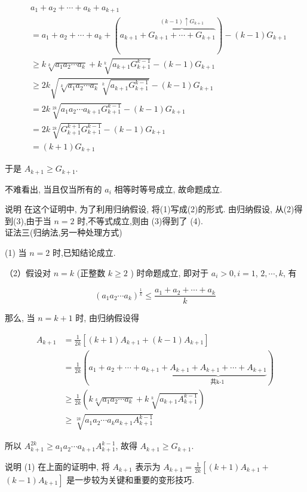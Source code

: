 \begin{align*}
& a_{1}+a_{2}+\cdots+a_{k}+a_{k+1}  \tag{1}\\
& =a_{1}+a_{2}+\cdots+a_{k}+(a_{k+1}+\overbrace{G_{k+1}+\cdots+G_{k+1}}^{(k-1) \uparrow G_{k+1}})-(k-1) G_{k+1}  \tag{2}\\
& \geqslant k \sqrt[k]{a_{1} a_{2} \cdots a_{k}}+k \sqrt[k]{a_{k+1} G_{k+1}^{k-1}}-(k-1) G_{k+1}  \tag{3}\\
& \geqslant 2 k \sqrt{\sqrt[k]{a_{1} a_{2} \cdots a_{k}} \sqrt[k]{a_{k+1} G_{k+1}^{k-1}}}-(k-1) G_{k+1}  \tag{4}\\
& =2 k \sqrt[2 k]{a_{1} a_{2} \cdots a_{k+1} G_{k+1}^{k-1}}-(k-1) G_{k+1}  \tag{5}\\
& =2 k \sqrt[2 k]{G_{k+1}^{k+1} G_{k+1}^{k-1}}-(k-1) G_{k+1}  \tag{6}\\
& =(k+1) G_{k+1} \tag{7}
\end{align*}


于是 $A_{k+1} \geqslant G_{k+1}$.

不难看出, 当且仅当所有的 $a_{i}$ 相等时等号成立, 故命题成立.

说明 在这个证明中, 为了利用归纳假设, 将(1)写成(2)的形式. 由归纳假设, 从(2)得到(3),由于当 $n=2$ 时,不等式成立,则由 (3)得到了 (4).\\
证法三(归纳法,另一种处理方式)

(1) 当 $n=2$ 时,已知结论成立.

（2）假设对 $n=k$ (正整数 $k \geqslant 2$ ) 时命题成立, 即对于 $a_{i}>0, i=1$, $2, \cdots, k$, 有

$$
\left(a_{1} a_{2} \cdots a_{k}\right)^{\frac{1}{k}} \leqslant \frac{a_{1}+a_{2}+\cdots+a_{k}}{k}
$$

那么, 当 $n=k+1$ 时, 由归纳假设得

$$
\begin{aligned}
A_{k+1} & =\frac{1}{2 k}\left[(k+1) A_{k+1}+(k-1) A_{k+1}\right] \\
& =\frac{1}{2 k}(a_{1}+a_{2}+\cdots+a_{k+1}+\underbrace{A_{k+1}+A_{k+1}+\cdots+A_{k+1}}_{\text {共k-1 }}) \\
& \geqslant \frac{1}{2 k}\left(k \sqrt[k]{a_{1} a_{2} \cdots a_{k}}+k \sqrt[k]{a_{k+1} A_{k+1}^{k-1}}\right) \\
& \geqslant \sqrt[2 k]{a_{1} a_{2} \cdots a_{k} a_{k+1} A_{k+1}^{k-1}}
\end{aligned}
$$

所以 $A_{k+1}^{2 k} \geqslant a_{1} a_{2} \cdots a_{k+1} A_{k+1}^{k-1}$, 故得 $A_{k+1} \geqslant G_{k+1}$.

说明 (1) 在上面的证明中, 将 $A_{k+1}$ 表示为 $A_{k+1}=\frac{1}{2 k}\left[(k+1) A_{k+1}+\right.$ $\left.(k-1) A_{k+1}\right]$ 是一步较为关键和重要的变形技巧.

